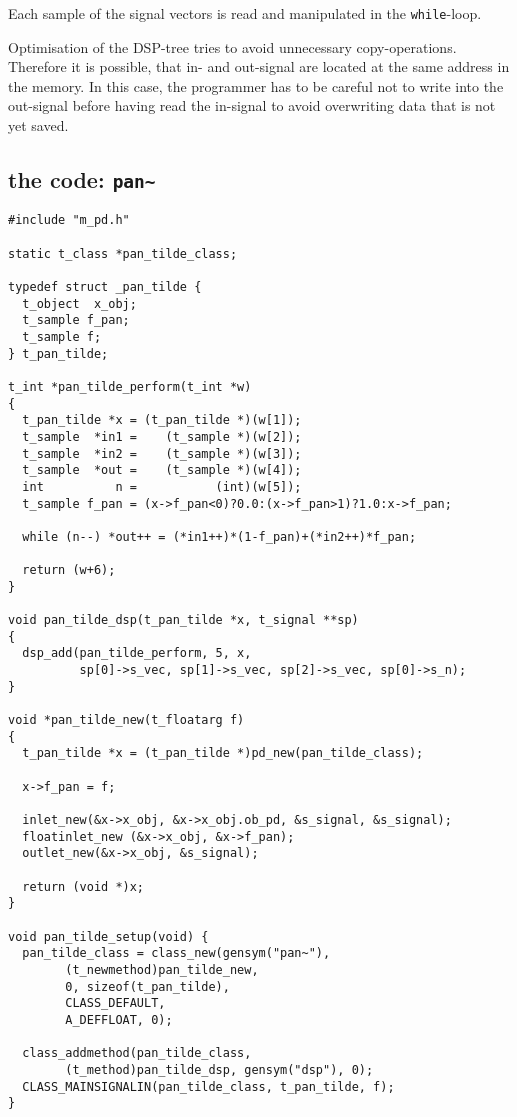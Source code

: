 \documentclass[12pt, a4paper,english,titlepage]{article}
\begin{document}
Each sample of the signal vectors is read and manipulated in the \verb+while+-loop.


Optimisation of the DSP-tree tries to avoid unnecessary copy-operations.
Therefore it is possible, that in- and out-signal are located
at the same address in the memory.
In this case, the programmer has to be careful not to write into the out-signal
before having read the in-signal to avoid overwriting data that is not yet saved.

\subsection{the code: \tt pan\~\/}

\begin{verbatim}
#include "m_pd.h"

static t_class *pan_tilde_class;

typedef struct _pan_tilde {
  t_object  x_obj;
  t_sample f_pan;
  t_sample f;
} t_pan_tilde;

t_int *pan_tilde_perform(t_int *w)
{
  t_pan_tilde *x = (t_pan_tilde *)(w[1]);
  t_sample  *in1 =    (t_sample *)(w[2]);
  t_sample  *in2 =    (t_sample *)(w[3]);
  t_sample  *out =    (t_sample *)(w[4]);
  int          n =           (int)(w[5]);
  t_sample f_pan = (x->f_pan<0)?0.0:(x->f_pan>1)?1.0:x->f_pan;

  while (n--) *out++ = (*in1++)*(1-f_pan)+(*in2++)*f_pan;

  return (w+6);
}

void pan_tilde_dsp(t_pan_tilde *x, t_signal **sp)
{
  dsp_add(pan_tilde_perform, 5, x,
          sp[0]->s_vec, sp[1]->s_vec, sp[2]->s_vec, sp[0]->s_n);
}

void *pan_tilde_new(t_floatarg f)
{
  t_pan_tilde *x = (t_pan_tilde *)pd_new(pan_tilde_class);

  x->f_pan = f;
  
  inlet_new(&x->x_obj, &x->x_obj.ob_pd, &s_signal, &s_signal);
  floatinlet_new (&x->x_obj, &x->f_pan);
  outlet_new(&x->x_obj, &s_signal);

  return (void *)x;
}

void pan_tilde_setup(void) {
  pan_tilde_class = class_new(gensym("pan~"),
        (t_newmethod)pan_tilde_new,
        0, sizeof(t_pan_tilde),
        CLASS_DEFAULT, 
        A_DEFFLOAT, 0);

  class_addmethod(pan_tilde_class,
        (t_method)pan_tilde_dsp, gensym("dsp"), 0);
  CLASS_MAINSIGNALIN(pan_tilde_class, t_pan_tilde, f);
}
\end{verbatim}
\end{document}
